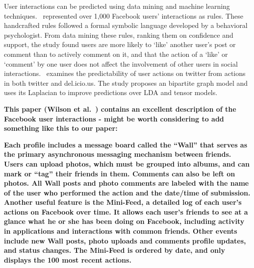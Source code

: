 User interactions can be predicted using data mining and machine learning techniques.~\cite{gomes2011social} represented over 1,000 Facebook users' interactions as rules. These handcrafted rules followed a formal symbolic language developed by a behavioral psychologist. From data mining these rules, ranking them on confidence and support, the study found users are more likely to `like' another user's post or comment than to actively comment on it, and that the action of a `like' or `comment' by one user does not affect the involvement of other users in social interactions.~\cite{nori2011exploiting} examines the predictability of user actions on twitter from actions in both twitter and del.icio.us. The study proposes an bipartite graph model and uses its Laplacian to improve predictions over LDA and tensor models.






\textbf{This paper (Wilson et al.~\cite{wilson2009user}) contains an excellent description of the Facebook user interactions - might be worth considering to add something like this to our paper:}


\textbf{Each profile includes a message board called the “Wall” that serves as the primary asynchronous messaging mechanism between friends. Users can upload photos, which must be grouped into albums, and can mark or “tag” their friends in them. Comments can also be left on photos. All Wall posts and photo comments are labeled with the name of the user who performed the action and the date/time of submission. Another useful feature is the Mini-Feed, a detailed log of each user’s actions on Facebook over time. It allows each user’s friends to see at a glance what he or she has been doing on Facebook, including activity in applications and interactions with common friends. Other events include new Wall posts, photo uploads and comments profile updates, and status changes. The Mini-Feed is ordered by date, and only displays the 100 most recent actions.}
